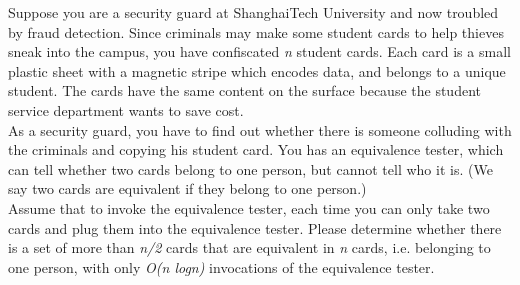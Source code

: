 \problem{}
Suppose you are a security guard at ShanghaiTech University and now troubled by fraud detection. Since criminals may make some student cards to help thieves sneak into the campus, you have confiscated \textit{n} student cards. Each card is a small plastic sheet with a magnetic stripe which encodes data, and belongs to a unique student. The cards have the same content on the surface because the student service department wants to save cost. \\

As a security guard, you have to find out whether there is someone colluding with the criminals and copying his student card. You has an equivalence tester, which can tell whether two cards belong to one person, but cannot tell who it is. (We say two cards are equivalent if they belong to one person.)\\

Assume that to invoke the equivalence tester, each time you can only take two cards and plug them into the equivalence tester. Please determine whether there is a set of more than \textit{n/2} cards that are equivalent in \textit{n} cards, i.e. belonging to one person, with only \textit{O(n logn)} invocations of the equivalence tester.

